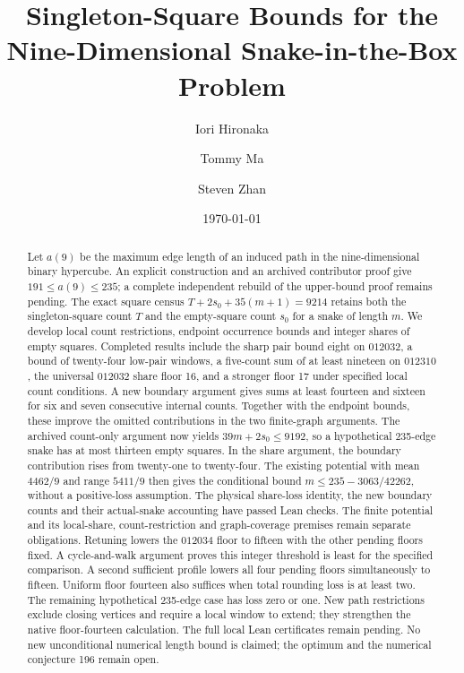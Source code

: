\documentclass[11pt,a4paper]{article}
\title{Singleton-Square Bounds for the\\
Nine-Dimensional Snake-in-the-Box Problem}
\author{Iori Hironaka \and Tommy Ma \and Steven Zhan}
\date{\today}
\theoremstyle{definition}
\theoremstyle{remark}
\begin{document}
\maketitle
\begin{abstract}
Let $a(9)$ be the maximum edge length of an induced path in the
nine-dimensional binary hypercube. An explicit construction and an archived
contributor proof give $191\le a(9)\le235$; a complete independent rebuild
of the upper-bound proof remains pending. The exact square census
$T+2s_0+35(m+1)=9214$ retains both the singleton-square count $T$ and the
empty-square count $s_0$ for a snake of length $m$.
We develop local count restrictions, endpoint occurrence bounds and integer
shares of empty squares. Completed results include the sharp pair bound
eight on $012032$, a bound of twenty-four low-pair windows, a five-count
sum of at least nineteen on $012310$, the universal $012032$ share floor
16, and a stronger floor 17 under specified local count conditions.
A new boundary argument gives sums at least fourteen and sixteen for
six and seven consecutive internal counts. Together with the endpoint
bounds, these improve the omitted contributions in the two finite-graph
arguments. The archived count-only argument now yields
$39m+2s_0\le9192$, so a hypothetical 235-edge snake has at most thirteen
empty squares. In the share argument, the boundary contribution rises
from twenty-one to twenty-four. The existing potential with mean
$4462/9$ and range $5411/9$ then gives the conditional bound
$m\le235-3063/42262$, without a positive-loss assumption.
The physical share-loss identity, the new boundary counts and their
actual-snake accounting have passed Lean checks. The finite potential
and its local-share, count-restriction and graph-coverage premises remain
separate obligations. Retuning lowers the $012034$ floor to fifteen with the other pending
floors fixed. A cycle-and-walk argument proves this integer threshold
is least for the specified comparison. A second sufficient profile
lowers all four pending floors simultaneously to fifteen. Uniform floor
fourteen also suffices when total rounding loss is at least two.
The remaining hypothetical 235-edge case has loss zero or one.
New path restrictions exclude closing vertices and require a local
window to extend; they strengthen the native floor-fourteen calculation.
The full local Lean certificates remain pending.
No new unconditional numerical length bound is claimed; the
optimum and the numerical conjecture 196 remain open.

\end{abstract}
\end{document}
